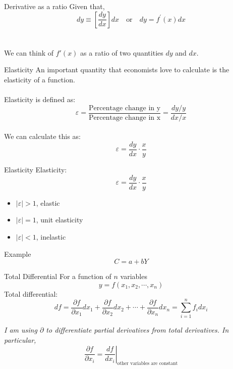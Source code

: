 \documentclass{./../../Latex/teaching_slides}
\begin{document}
\begin{frame}{Derivative as a ratio}
	Given that, 
	$$
d y \equiv\left[\frac{d y}{d x}\right] d x \quad \text {or} \quad d y=f^{\prime}(x) d x
$$ \\~\\
We can think of $f'(x)$ as a ratio of two quantities $ dy $ and $dx$. 
 \end{frame}

\begin{frame}{Elasticity}
An important quantity that economists love to calculate is the elasticity of a function. \\~\\
Elasticity is defined as:
\[ \varepsilon = \frac{\text{Percentage change in y}}{\text{Percentage change in x}} = \frac{dy/y}{dx/x} \] \\

We can calculate this as:
\[ \varepsilon = \frac{dy}{dx} \cdot \frac{x}{y} \]
\end{frame}

\begin{frame}{Elasticity}
Elasticity: 
\[ \varepsilon = \frac{dy}{dx} \cdot \frac{x}{y} \]
\vspace{1cm}
\begin{itemize}
	\item $|\varepsilon|>1$, elastic
	\item $|\varepsilon|=1$, unit elasticity
	\item $|\varepsilon|<1$, inelastic
\end{itemize}
\end{frame}

\begin{frame}{Example}
$$ C = a + bY $$
\end{frame}

\begin{frame}{Total Differential}
For a function of $n$ variables \[y=f\left(x_{1}, x_{2}, \cdots, x_{n}\right)\]
Total differential:
\[
d f=\frac{\partial f}{\partial x_{1}} d x_{1}+\frac{\partial f}{\partial x_{2}} d x_{2}+\cdots+\frac{\partial f}{\partial x_{n}} d x_{n}=\sum_{i=1}^{n} f_{i} d x_{i}
\]

\vspace{1em}
\textit{I am using $\partial$ to differentiate partial derivatives from total derivatives. In particular, $$\left.\frac{\partial f}{\partial x_{i}} = \frac{d f}{d x_{i}} \right\vert_{\text{other variables are constant}} $$}
\end{frame}
\end{document}
